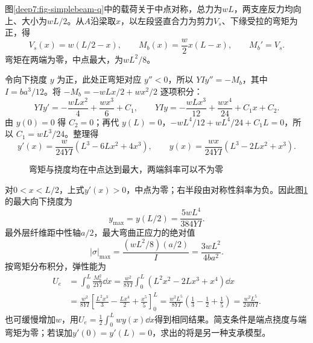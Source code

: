 \begin{solution}
图\ref{deep7:fig-simplebeam-q}中的载荷关于中点对称，总力为$wL$，两支座反力均向上、大小为$wL/2$。从$A$沿梁取$x$，以左段竖直合力为剪力$V_s$、下缘受拉的弯矩为正，得
\[
 V_s(x)=w(L/2-x),\qquad M_b(x)=\frac w2x(L-x),
 \qquad M_b'=V_s.
\]
弯矩在两端为零，中点最大，为$wL^2/8$。

令向下挠度 $y$ 为正，此处正弯矩对应 $y''<0$，所以 $YIy''=-M_b$，其中 $I=ba^3/12$。将 $-M_b=-wLx/2+wx^2/2$ 逐项积分：
\[
YIy'=-\frac{wLx^2}{4}+\frac{wx^3}{6}+C_1,\qquad
YIy=-\frac{wLx^3}{12}+\frac{wx^4}{24}+C_1x+C_2.
\]
由 $y(0)=0$ 得 $C_2=0$；再代 $y(L)=0$，$-wL^4/12+wL^4/24+C_1L=0$，所以 $C_1=wL^3/24$。整理得
\[
 y'(x)=\frac{w}{24YI}(L^3-6Lx^2+4x^3),
 \qquad
 y(x)=\frac{wx}{24YI}(L^3-2Lx^2+x^3).
\]
\begin{figure}[H]\centering
{}
\caption{弯矩与挠度均在中点达到最大，两端斜率可以不为零}\label{deep7:fig-simplebeam-s}
\end{figure}
对$0<x<L/2$，上式$y'(x)>0$，中点为零；右半段由对称性斜率为负。因此图\ref{deep7:fig-simplebeam-s}的最大向下挠度为
\[
 y_{\max}=y(L/2)=\frac{5wL^4}{384YI}.
\]
最外层纤维距中性轴$a/2$，最大弯曲正应力的绝对值
\[
 |\sigma|_{\max}=\frac{(wL^2/8)(a/2)}I=\frac{3wL^2}{4ba^2}.
\]
按弯矩分布积分，弹性能为
\[
\begin{aligned}
U_e&=\int_0^L\frac{M_b^2}{2YI}\dd x
=\frac{w^2}{8YI}\int_0^L(L^2x^2-2Lx^3+x^4)\dd x\\
&=\frac{w^2}{8YI}\left[\frac{L^2x^3}{3}-\frac{Lx^4}{2}+\frac{x^5}{5}\right]_0^L
=\frac{w^2L^5}{8YI}\left(\frac13-\frac12+\frac15\right)
=\frac{w^2L^5}{240YI}.
\end{aligned}
\]
也可缓慢增加$w$，用$U_e=\tfrac12\int_0^Lwy(x)\dd x$得到相同结果。简支条件是端点挠度与端弯矩为零；若误加$y'(0)=y'(L)=0$，求出的将是另一种支承模型。
\end{solution}



